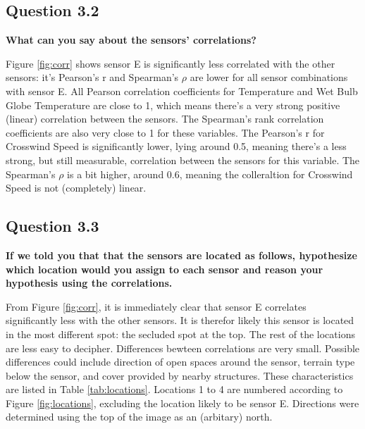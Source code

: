 \documentclass{report}
\begin{document}
	
	\subsection{Question 3.2}
	\textbf{What can you say about the sensors’ correlations?}
	
	Figure \ref{fig:corr} shows sensor E is significantly less correlated with the other sensors: it's Pearson's r and Spearman's $\rho$ are lower for all sensor combinations with sensor E. All Pearson correlation coefficients for Temperature and Wet Bulb Globe Temperature are close to 1, which means there's a very strong positive (linear) correlation between the sensors. The Spearman's rank correlation coefficients are also very close to 1 for these variables. The Pearson's r for Crosswind Speed is significantly lower, lying around 0.5, meaning there's a less strong, but still measurable, correlation between the sensors for this variable. The Spearman's $\rho$ is a bit higher, around 0.6, meaning the colleraltion for Crosswind Speed is not (completely) linear.
	
	\subsection{Question 3.3}
	\textbf{If we told you that that the sensors are located as follows, hypothesize which location would you assign to each sensor and reason your hypothesis using the correlations.}
	
	From Figure \ref{fig:corr}, it is immediately clear that sensor E correlates significantly less with the other sensors. It is therefor likely this sensor is located in the most different spot: the secluded spot at the top. The rest of the locations are less easy to decipher. Differences bewteen correlations are very small. Possible differences could include direction of open spaces around the sensor, terrain type below the sensor, and cover provided by nearby structures. These characteristics are listed in Table \ref{tab:locations}. Locations 1 to 4 are numbered according to Figure \ref{fig:locations}, excluding the location likely to be sensor E. Directions were determined using the top of the image as an (arbitary) north. 
	
	\FloatBarrier
	\begin{table}[htbp]
		\centering
		\caption{Possible causes of differences between sensors}
		\label{tab:locations}%
	\end{table}%
	\FloatBarrier
	
\end{document}
